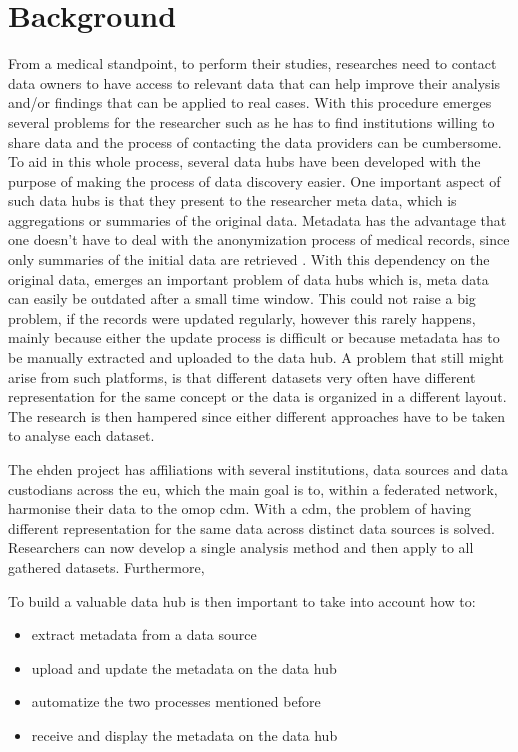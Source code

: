 \chapter{Background}
\label{chapter:background}

From a medical standpoint, to perform their studies, researches need to contact data
owners to have access to relevant data that can help improve their analysis and/or
findings that can be applied to real cases.
With this procedure emerges several problems for the researcher such as he has to find
institutions willing to share data and the process of contacting the data providers can
be cumbersome.
To aid in this whole process, several data hubs have been developed with the purpose of
making the process of data discovery easier.
One important aspect of such data hubs is that they present to the researcher meta
data, which is aggregations or summaries of the original data.
Metadata has the advantage that one doesn't have to deal with the anonymization process
of medical records, since only summaries of the initial data are retrieved
\cite{egenvar, montra}.
With this dependency on the original data, emerges an important problem of data hubs
which is, meta data can easily be outdated after a small time window.
This could not raise a big problem, if the records were updated regularly, however this
rarely happens, mainly because either the update process is difficult or because
metadata has to be manually extracted and uploaded to the data hub.
A problem that still might arise from such platforms, is that different datasets very
often have different representation for the same concept or the data is organized in a
different layout.
The research is then hampered since either different approaches have to be taken to
analyse each dataset.

The \gls{ehden} project has affiliations with several institutions, data sources and
data custodians across the \gls{eu}, which the main goal is to, within a federated
network, harmonise their data to the \gls{omop} \gls{cdm}. %
With a \gls{cdm}, the problem of having different representation for the same data
across distinct data sources is solved.
Researchers can now develop a single analysis method and then apply to all gathered
datasets.
Furthermore, 

To build a valuable data hub is then important to take into account how to:
\begin{itemize}
    \item extract metadata from a data source
    \item upload and update the metadata on the data hub
    \item automatize the two processes mentioned before
    \item receive and display the metadata on the data hub
\end{itemize}


